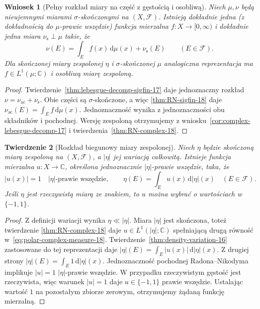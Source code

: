 \documentclass[11pt,a4paper,oneside]{book}
\numberwithin{equation}{chapter}
\theoremstyle{plain}
\newtheorem{twierdzenie}{Twierdzenie}[chapter]
\newtheorem{wniosek}[twierdzenie]{Wniosek}
\theoremstyle{definition}
\theoremstyle{remark}
\begin{document}
\begin{wniosek}[Pełny rozkład miary na część z gęstością i osobliwą]
\label{cor:RN-lebesgue-sum-18}
Niech $\mu,\nu$ będą nieujemnymi miarami
$\sigma$-skończonymi na $(X,\mathcal F)$.
Istnieją dokładnie jedna (z dokładnością do
$\mu$-prawie wszędzie) funkcja mierzalna
$f:X\to[0,\infty)$ i dokładnie jedna miara
$\nu_{\mathrm{s}}\perp\mu$ takie, że
\begin{equation}\label{eq:RN-Lebesgue-decomp-18}
\nu(E)=\int_E f(x)\,\mathrm d\mu(x)+\nu_{\mathrm{s}}(E)
\qquad(E\in\mathcal F).
\end{equation}
Dla skończonej miary zespolonej $\eta$ i
$\sigma$-skończonej $\mu$ analogiczna reprezentacja ma
$f\in L^1(\mu;\mathbb C)$ i osobliwą miarę zespoloną.
\end{wniosek}
\begin{proof}
Twierdzenie~\ref{thm:lebesgue-decomp-sigfin-17}
daje jednoznaczny rozkład $\nu=\nu_{\mathrm{ac}}+
\nu_{\mathrm{s}}$. Obie części są $\sigma$-skończone,
a więc \ref{thm:RN-sigfin-18} daje
$\nu_{\mathrm{ac}}(E)=\int_Ef\,\mathrm d\mu(x)$.
Jednoznaczność wynika z jednoznaczności obu składników
i pochodnej. Wersję zespoloną otrzymujemy z
wniosku~\ref{cor:complex-lebesgue-decomp-17}
i twierdzenia~\ref{thm:RN-complex-18}.
\end{proof}

\begin{twierdzenie}[Rozkład biegunowy miary zespolonej]
\label{thm:polar-complex-measure-18}
Niech $\eta$ będzie skończoną miarą zespoloną
na $(X,\mathcal F)$, a $|\eta|$ jej wariacją
całkowitą. Istnieje funkcja mierzalna
$u:X\to\mathbb C$, określona jednoznacznie
$|\eta|$-prawie wszędzie, taka, że
\begin{equation}\label{eq:polar-complex-measure-18}
 |u(x)|=1\quad |\eta|\text{-prawie wszędzie},\qquad
 \eta(E)=\int_Eu(x)\,\mathrm d|\eta|(x)
 \quad(E\in\mathcal F).
\end{equation}
Jeśli $\eta$ jest rzeczywistą miarą ze znakiem, to
$u$ można wybrać o wartościach w $\{-1,1\}$.
\end{twierdzenie}
\begin{proof}
Z definicji wariacji wynika $\eta\ll|\eta|$.
Miara $|\eta|$ jest skończona, toteż twierdzenie
\ref{thm:RN-complex-18} daje $u\in L^1(|\eta|;\mathbb C)$
spełniającą drugą równość w~\eqref{eq:polar-complex-measure-18}.
Twierdzenie~\ref{thm:density-variation-16} zastosowane
do tej reprezentacji daje
$|\eta|(E)=\int_E|u(x)|\,\mathrm d|\eta|(x)$.
Z drugiej strony $|\eta|(E)=\int_E1\,\mathrm d|\eta|(x)$.
Jednoznaczność pochodnej Radona--Nikodyma implikuje
$|u|=1$ $|\eta|$-prawie wszędzie.
W przypadku rzeczywistym gęstość jest rzeczywista,
więc warunek $|u|=1$ daje $u\in\{-1,1\}$
prawie wszędzie. Ustalając wartość $1$ na pozostałym
zbiorze zerowym, otrzymujemy żądaną funkcję mierzalną.
\end{proof}
\end{document}
